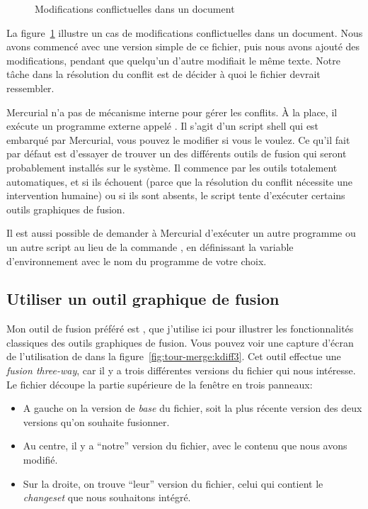 \begin{figure}[ht]
  \centering
  \caption{Modifications conflictuelles dans un document}
  \label{fig:tour-merge:conflict}
\end{figure}

La figure~\ref{fig:tour-merge:conflict} illustre un cas de modifications
conflictuelles dans un document. Nous avons commencé avec une version simple
de ce fichier, puis nous avons ajouté des modifications, pendant que 
quelqu'un d'autre modifiait le même texte. Notre tâche dans la résolution
du conflit est de décider à quoi le fichier devrait ressembler.

Mercurial n'a pas de mécanisme interne pour gérer les conflits. 
À la place, il exécute un programme externe appelé .
Il s'agit d'un script shell qui est embarqué par Mercurial, vous
pouvez le modifier si vous le voulez. Ce qu'il fait par défaut est
d'essayer de trouver un des différents outils de fusion qui seront
probablement installés sur le système. Il commence par les outils
totalement automatiques, et si ils échouent (parce que la résolution
du conflit nécessite une intervention humaine) ou si ils sont absents,
le script tente d'exécuter certains outils graphiques de fusion.

Il est aussi possible de demander à Mercurial d'exécuter un autre
programme ou un autre script au lieu de la commande ,
en définissant la variable d'environnement  avec le nom
du programme de votre choix.

\subsection{Utiliser un outil graphique de fusion}

Mon outil de fusion préféré est , que j'utilise ici
pour illustrer les fonctionnalités classiques des outils graphiques 
de fusion. Vous pouvez voir une capture d'écran de l'utilisation de 
 dans la figure~\ref{fig:tour-merge:kdiff3}. Cet outil
effectue une \emph{fusion \textit{three-way}}, car il y a trois différentes
versions du fichier qui nous intéresse. Le fichier découpe la partie
supérieure de la fenêtre en trois panneaux:

\begin{itemize}
\item A gauche on la version de \emph{base} du fichier, soit la plus 
  récente version des deux versions qu'on souhaite fusionner.
\item Au centre, il y a ``notre'' version du fichier, avec le contenu 
  que nous avons modifié.
\item Sur la droite, on trouve ``leur'' version du fichier, celui qui
  contient le \textit{changeset} que nous souhaitons intégré. 
\end{itemize}

